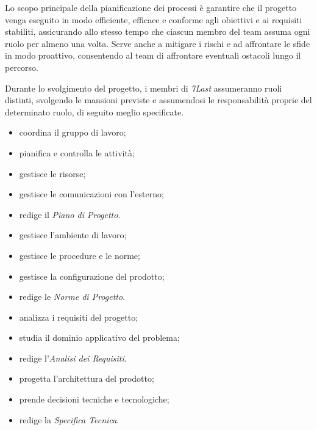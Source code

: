 Lo scopo principale della pianificazione dei processi è garantire che il progetto venga eseguito in modo efficiente, efficace e conforme agli obiettivi e ai requisiti stabiliti, assicurando allo stesso tempo che ciascun membro del team assuma ogni ruolo per almeno una volta. Serve anche a mitigare i rischi e ad affrontare le sfide in modo proattivo, consentendo al team di affrontare eventuali ostacoli lungo il percorso.

Durante lo svolgimento del progetto, i membri di \textit{7Last} assumeranno ruoli distinti, svolgendo le mansioni previste e assumendosi le responsabilità proprie del determinato ruolo, di seguito meglio specificate.

\begin{itemize}
    \item coordina il gruppo di lavoro;
    \item pianifica e controlla le attività;
    \item gestisce le risorse;
    \item gestisce le comunicazioni con l'esterno;
    \item redige il \textit{Piano di Progetto}.
\end{itemize}

\begin{itemize}
    \item gestisce l'ambiente di lavoro;
    \item gestisce le procedure e le norme;
    \item gestisce la configurazione del prodotto;
    \item redige le \textit{Norme di Progetto}.
\end{itemize}

\begin{itemize}
    \item analizza i requisiti del progetto;
    \item studia il dominio applicativo del problema;
    \item redige l'\textit{Analisi dei Requisiti}.
\end{itemize}

\begin{itemize}
    \item progetta l'architettura del prodotto;
    \item prende decisioni tecniche e tecnologiche;
    \item redige la \textit{Specifica Tecnica}.
\end{itemize}

